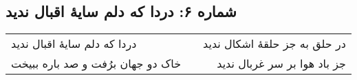 \begin{center}
\section*{شماره ۶: دردا که دلم سایۀ اقبال ندید}
\label{sec:006}
\begin{longtable}{l p{0.5cm} r}
دردا که دلم سایهٔ اقبال ندید
&&
در حلق به جز حلقهٔ اشکال ندید
\\
خاک دو جهان برُفت و صد باره ببیخت
&&
جز باد هوا بر سر غربال ندید
\\
\end{longtable}
\end{center}
